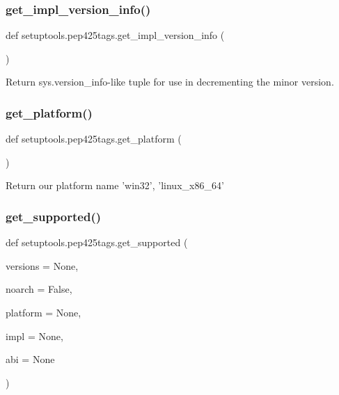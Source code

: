 \subsubsection{\texorpdfstring{get\+\_\+impl\+\_\+version\+\_\+info()}{get\_impl\_version\_info()}}
{\footnotesize\ttfamily def setuptools.\+pep425tags.\+get\+\_\+impl\+\_\+version\+\_\+info (\begin{DoxyParamCaption}{ }\end{DoxyParamCaption})}

\begin{DoxyVerb}Return sys.version_info-like tuple for use in decrementing the minor
version.\end{DoxyVerb}
 \mbox{\label{namespacesetuptools_1_1pep425tags_a52d6789c69021dee973e4f9b342f65b1}} 
\subsubsection{\texorpdfstring{get\+\_\+platform()}{get\_platform()}}
{\footnotesize\ttfamily def setuptools.\+pep425tags.\+get\+\_\+platform (\begin{DoxyParamCaption}{ }\end{DoxyParamCaption})}

\begin{DoxyVerb}Return our platform name 'win32', 'linux_x86_64'\end{DoxyVerb}
 \mbox{\label{namespacesetuptools_1_1pep425tags_a0f5730fc6765b4a3156dc37d475d59bb}} 
\subsubsection{\texorpdfstring{get\+\_\+supported()}{get\_supported()}}
{\footnotesize\ttfamily def setuptools.\+pep425tags.\+get\+\_\+supported (\begin{DoxyParamCaption}\item[{}]{versions = {\ttfamily None},  }\item[{}]{noarch = {\ttfamily False},  }\item[{}]{platform = {\ttfamily None},  }\item[{}]{impl = {\ttfamily None},  }\item[{}]{abi = {\ttfamily None} }\end{DoxyParamCaption})}

